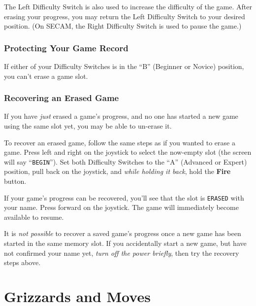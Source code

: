 \documentclass[10pt,twocolumn,openany,article]{memoir}
\begin{document}
\fi

The Left  Difficulty Switch is also  used to increase the  difficulty of
the  game.  After  erasing  your  progress,  you  may  return  the  Left
Difficulty  Switch  to  your  desired position.  (On  SECAM,  the  Right
Difficulty Switch is used to pause the game.)

\subsection{Protecting Your Game Record}

If  either of  your Difficulty  Switches is  in the  ``B'' (Beginner  or
Novice) position, you can't erase a game slot.

\ifdefined\DEMO\else

\subsection{Recovering an Erased Game}

If you have \emph{just} erased a game's progress, and no one has started
a new game using the same slot yet, you may be able to un-erase it.

To recover  an erased game,  follow the same steps  as if you  wanted to
erase  a game.  Press  left and  right  on the  joystick  to select  the
now-empty  slot  (the  screen  will say  ``\texttt{BEGIN}'').  Set  both
Difficulty Switches  to the  ``A'' (Advanced  or Expert)  position, pull
back  on  the joystick,  and  \emph{while  holding  it back},  hold  the
\textbf{Fire} button.

If your  game's progress can be  recovered, you'll see that  the slot is
\texttt{ERASED} with your name. Press  forward on the joystick. The game
will immediately become available to resume.

It is \emph{not possible} to recover  a saved game's progress once a new
game has been started in the same memory slot. If you accidentally start
a new  game, but have  not confirmed your  name yet, \emph{turn  off the
  power briefly}, then try the recovery steps above.

\fi

\fi %

\ifdefined\ATARIAGESAVE
\vfill
\fi

\chapter{Grizzards and Moves}\label{ch:Grizzards}
\end{document}
